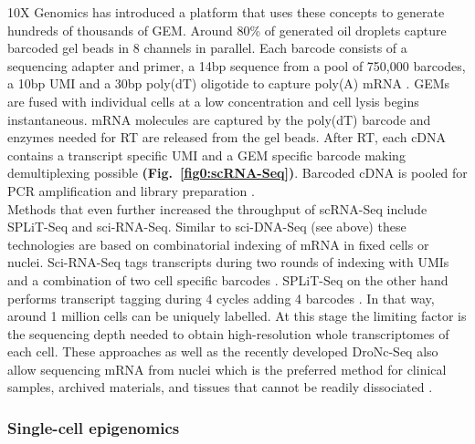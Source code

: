 \newpage

10X Genomics\texttrademark{} has introduced a platform that uses these concepts to generate hundreds of thousands of \gls{GEM}. Around 80\% of generated oil droplets capture barcoded gel beads in 8 channels in parallel. Each barcode consists of a sequencing adapter and primer, a 14bp sequence from a pool of 750,000 barcodes, a 10bp UMI and a 30bp poly(dT) oligotide to capture poly(A) mRNA \citep{Zheng2017}. GEMs are fused with individual cells at a low concentration and cell lysis begins instantaneous. mRNA molecules are captured by the poly(dT) barcode and enzymes needed for \gls{RT} are released from the gel beads. After RT, each cDNA contains a transcript specific UMI and a GEM specific barcode making demultiplexing possible \textbf{(Fig.~\ref{fig0:scRNA-Seq})}. Barcoded cDNA is pooled for PCR amplification and library preparation \citep{Zheng2017}.\\

Methods that even further increased the throughput of scRNA-Seq include \gls{SPLiT-Seq} and sci-RNA-Seq. Similar to sci-DNA-Seq (see above) these technologies are based on combinatorial indexing of mRNA in fixed cells or nuclei. Sci-RNA-Seq tags transcripts during two rounds of indexing with UMIs and a combination of two cell specific barcodes \citep{Cao2017}.  SPLiT-Seq on the other hand performs transcript tagging during 4 cycles adding 4 barcodes \citep{Rosenberg2018}. In that way, around 1 million cells can be uniquely labelled. At this stage the limiting factor is the sequencing depth needed to obtain high-resolution whole transcriptomes of each cell.	These approaches as well as the recently developed \gls{DroNc-Seq} also allow sequencing mRNA from nuclei which is the preferred method for clinical samples, archived materials, and tissues that cannot be readily dissociated \citep{Habib2017}. 


\subsubsection{Single-cell epigenomics}

